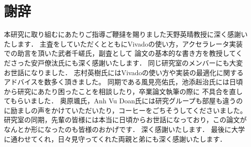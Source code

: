 \chapter{謝辞}
{
本研究に取り組むにあたりご指導ご鞭撻を賜りました天野英晴教授に深く感謝いたします．
主査をしていただくとともにVivadoの使い方，アクセラレータ実装での助言を頂いた武者千嵯氏，副査として
論文の基本的な書き方を教授してくださった安戸僚汰氏にも深く感謝いたします．
同じ研究室のメンバーにも大変お世話になりました．
志村英樹氏にはVivadoの使い方や実装の最適化に関するアドバイスを数多く頂きました。
同期である風見亮佑氏，池添赳治氏には日頃から研究にあたり困ったことを相談したり，卒業論文執筆の際に
不具合を直してもらいました．
奥原颯氏，Anh Vu Doan氏には研究グループも部屋も違うのに励ましの声をかけていただいたり，コーヒーをごちそうしてくださいました。
研究室の同期，先輩の皆様には本当に日頃からお世話になっており，この論文がなんとか形になったのも皆様のおかげです．
深く感謝いたします．
最後に大学に通わせてくれ，日々見守ってくれた両親と弟にも深く感謝いたします．
}
